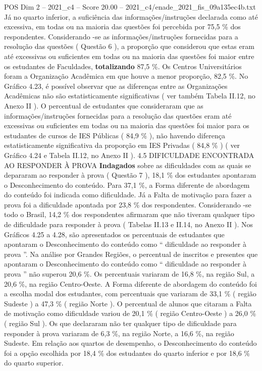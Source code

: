 \begin{textsample}{POS Dim 2 – 2021\_c4 – Score 20.00 – 2021\_c4/enade\_2021\_fis\_09a135ec4b.txt}
Já no quarto inferior, a suficiência das informações/instruções declarada como até excessiva, em todas ou na maioria das questões foi percebida por 75,5 \% dos respondentes.
Considerando -se as informações/instruções fornecidas para a resolução das questões ( Questão 6 ), a proporção que considerou que estas eram até excessivas ou suficientes em todas ou na maioria das questões foi maior entre os estudantes de Faculdades, \textbf{totalizando} 87,5 \%.
Os Centros Universitários foram a Organização Acadêmica em que houve a menor proporção, 82,5 \%.
No Gráfico 4.23, é possível observar que as diferenças entre as Organizações Acadêmicas não são estatisticamente significativas ( ver também Tabela II.12, no Anexo II ).
O percentual de estudantes que consideraram que as informações/instruções fornecidas para a resolução das questões eram até excessivas ou suficientes em todas ou na maioria das questões foi maior para os estudantes de cursos de IES Públicas ( 84,9 \% ), não havendo diferença estatisticamente significativa da proporção em IES Privadas ( 84,8 \% ) ( ver Gráfico 4.24 e Tabela II.12, no Anexo II ). 4.5 DIFICULDADE ENCONTRADA AO RESPONDER À PROVA \textbf{Indagados} sobre as dificuldades com as quais se depararam ao responder à prova ( Questão 7 ), 18,1 \% dos estudantes apontaram o Desconhecimento do conteúdo.
Para 37,1 \%, a Forma diferente de abordagem do conteúdo foi indicada como dificuldade.
Já a Falta de motivação para fazer a prova foi a dificuldade apontada por 23,8 \% dos respondentes.
Considerando -se todo o Brasil, 14,2 \% dos respondentes afirmaram que não tiveram qualquer tipo de dificuldade para responder à prova ( Tabelas II.13 e II.14, no Anexo II ).
Nos Gráficos 4.25 a 4.28, são apresentados os percentuais de estudantes que apontaram o Desconhecimento do conteúdo como “ dificuldade ao responder à prova ”.
Na análise por Grandes Regiões, o percentual de inscritos e presentes que apontaram o Desconhecimento do conteúdo como “ dificuldade ao responder à prova ” não superou 20,6 \%.
Os percentuais variaram de 16,8 \%, na região Sul, a 20,6 \%, na região Centro-Oeste.
A Forma diferente de abordagem do conteúdo foi a escolha modal dos estudantes, com percentuais que variaram de 33,1 \% ( região Sudeste ) a 47,3 \% ( região Norte ).
O percentual de alunos que citaram a Falta de motivação como dificuldade variou de 20,1 \% ( região Centro-Oeste ) a 26,0 \% ( região Sul ).
Os que declararam não ter qualquer tipo de dificuldade para responder à prova variaram de 6,3 \%, na região Norte, a 16,6 \%, na região Sudeste.
Em relação aos quartos de desempenho, o Desconhecimento do conteúdo foi a opção escolhida por 18,4 \% dos estudantes do quarto inferior e por 18,6 \% do quarto superior.

\end{textsample}
